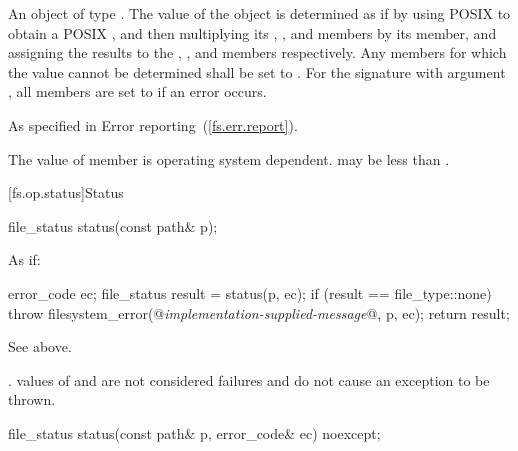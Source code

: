 \begin{itemdescr}
\pnum
\returns An object of type . The value of the 
  object is determined as if by using POSIX 
  to obtain a POSIX ,
  and then multiplying its , ,
  and  members by its  member,
  and assigning the results to the , ,
  and  members respectively. Any members for which the
  value cannot be determined shall be set to .
  For the signature with argument , all members are set to
   if an error occurs.

\pnum
\throws As specified in Error reporting~(\ref{fs.err.report}).

\pnum
\remarks The value of member 
      is operating system dependent. \enternote {} may be
      less than . \exitnote
\end{itemdescr}


[fs.op.status]{Status}

\begin{itemdecl}
file_status status(const path& p);
\end{itemdecl}

\begin{itemdescr}
\pnum
\effects As if:
\begin{codeblock}
error_code ec;
file_status result = status(p, ec);
if (result == file_type::none)
  throw filesystem_error(@\textit{implementation-supplied-message}@, p, ec);
return result;
\end{codeblock}

\pnum
\returns See above.

\pnum
\throws {}.
\enternote {} values of 
  and  are not considered failures and do not
  cause an exception to be thrown.\exitnote
\end{itemdescr}

\begin{itemdecl}
file_status status(const path& p, error_code& ec) noexcept;
\end{itemdecl}

